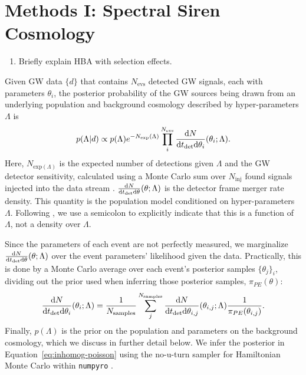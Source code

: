 \documentclass[]{aastex631}
\begin{document}
\section{Methods I: Spectral Siren Cosmology}
\label{sec:ss}
\begin{enumerate}
    \item Briefly explain HBA with selection effects.
\end{enumerate}
Given GW data $\{d\}$ that contains $N_{\text{evs}}$ detected GW signals, each with parameters $\theta_i$, the posterior probability of the GW sources being drawn from an underlying population and background cosmology described by hyper-parameters $\Lambda$ is \citep{loredo, taylor, mandel}
\begin{equation}
    p(\Lambda|d) \propto p(\Lambda) e^{-N_{\text{exp}}(\Lambda)} \prod_i^{N_{\text{evs}}} \frac{\diff N}{\diff t_{\det} \diff \theta_i} (\theta_i;\Lambda) .
    \label{eq:inhomog-poisson}
\end{equation}
Here, $N_{\text{exp}(\Lambda)}$ is the expected number of detections given $\Lambda$ and the GW detector sensitivity, calculated using a Monte Carlo sum over $N_{\text{inj}}$ found signals injected into the data stream \citep[see][for a detailed explanation of this process]{essick}.
$\frac{\text{d} N}{\text{d} t_{\det} \text{d} \theta} (\theta;\Lambda)$ is the detector frame merger rate density.
This quantity is the population model conditioned on hyper-parameters $\Lambda$. Following \citet{callister_parameter_2023}, we use a semicolon to explicitly indicate that this is a function of $\Lambda$, not a density over $\Lambda$.

Since the parameters of each event are not perfectly measured, we marginalize $\frac{\text{d} N}{\text{d} t_{\det} \text{d} \theta} (\theta;\Lambda)$ over the event parameters' likelihood given the data.
Practically, this is done by a Monte Carlo average over each event's posterior samples $\{\theta_j\}_i$, dividing out the prior used when inferring those posterior samples, $\pi_{PE}(\theta)$:
\begin{equation}
    \frac{\diff N}{\diff t_{\det} \diff \theta_i} (\theta_i;\Lambda) = \frac{1}{N_{\text{samples}}}\sum_j^{N_{\text{samples}}} \frac{\diff N}{\diff t_{\det} \diff \theta_{i,j}} (\theta_{i,j};\Lambda) \frac{1}{\pi_{PE}(\theta_{i,j})} .
    \label{eq:single-event-likelihood}
\end{equation}
Finally, $p(\Lambda)$ is the prior on the population and parameters on the background cosmology, which we discuss in further detail below.
We infer the posterior in Equation~\ref{eq:inhomog-poisson} using the no-u-turn sampler for Hamiltonian Monte Carlo within \texttt{numpyro} \citep{hoffman_no-u-turn_2011, numpyro}. 
\end{document}
